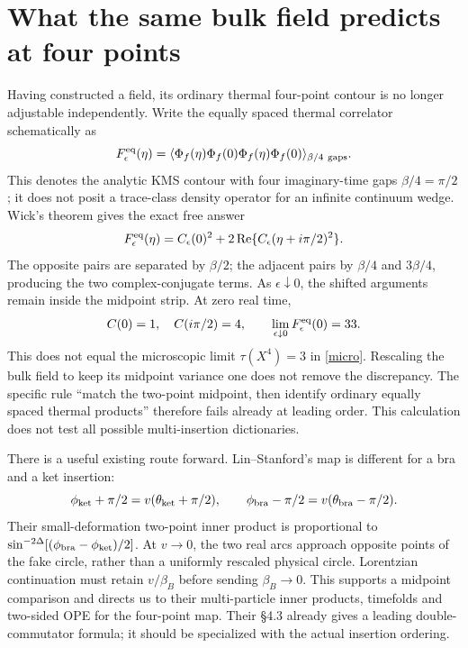 \documentclass[11pt,a4paper]{article}
\begin{document}
\section{What the same bulk field predicts at four points}
Having constructed a field, its ordinary thermal four-point contour is
no longer adjustable independently. Write the equally spaced thermal
correlator schematically as
\begin{equation}
 F^{\rm eq}_\epsilon(\eta)=
 \langle\Phi_f(\eta)\Phi_f(0)\Phi_f(\eta)\Phi_f(0)\rangle_{\beta/4\ \mathrm{gaps}}.
\end{equation}
This denotes the analytic KMS contour with four imaginary-time gaps
$\beta/4=\pi/2$; it does not posit a trace-class density operator for an
infinite continuum wedge. Wick's theorem gives the exact free answer
\begin{equation}
 F^{\rm eq}_\epsilon(\eta)=C_\epsilon(0)^2+
 2\operatorname{Re}\{C_\epsilon(\eta+i\pi/2)^2\}.\label{four}
\end{equation}
The opposite pairs are separated by $\beta/2$; the adjacent pairs by
$\beta/4$ and $3\beta/4$, producing the two complex-conjugate terms.
As $\epsilon\downarrow0$, the shifted arguments remain inside the
midpoint strip. At zero real time,
\begin{equation}
 C(0)=1,\quad C(i\pi/2)=4,\qquad
 \lim_{\epsilon\downarrow0}F^{\rm eq}_\epsilon(0)=33.\label{33}
\end{equation}
This does not equal the microscopic limit $\tau(X^4)=3$ in
\eqref{micro}. Rescaling the bulk field to keep its midpoint variance
one does not remove the discrepancy. The specific rule ``match the
two-point midpoint, then identify ordinary equally spaced thermal
products'' therefore fails already at leading order. This calculation
does not test all possible multi-insertion dictionaries.

There is a useful existing route forward. Lin--Stanford's map
\cite{ls} is different for a bra and a ket insertion:
\begin{equation}
 \phi_{\rm ket}+\pi/2=v(\theta_{\rm ket}+\pi/2),\qquad
 \phi_{\rm bra}-\pi/2=v(\theta_{\rm bra}-\pi/2).\label{fake}
\end{equation}
Their small-deformation two-point inner product is proportional to
$\sin^{-2\Delta}[(\phi_{\rm bra}-\phi_{\rm ket})/2]$.
At $v\to0$, the two real arcs approach opposite points of the fake
circle, rather than a uniformly rescaled physical circle. Lorentzian
continuation must retain $v/\beta_B$ before sending $\beta_B\to0$.
This supports a midpoint comparison and directs us to their
multi-particle inner products, timefolds and two-sided OPE for the
four-point map. Their \S4.3 already gives a leading double-commutator
formula; it should be specialized with the actual insertion ordering.
\end{document}
